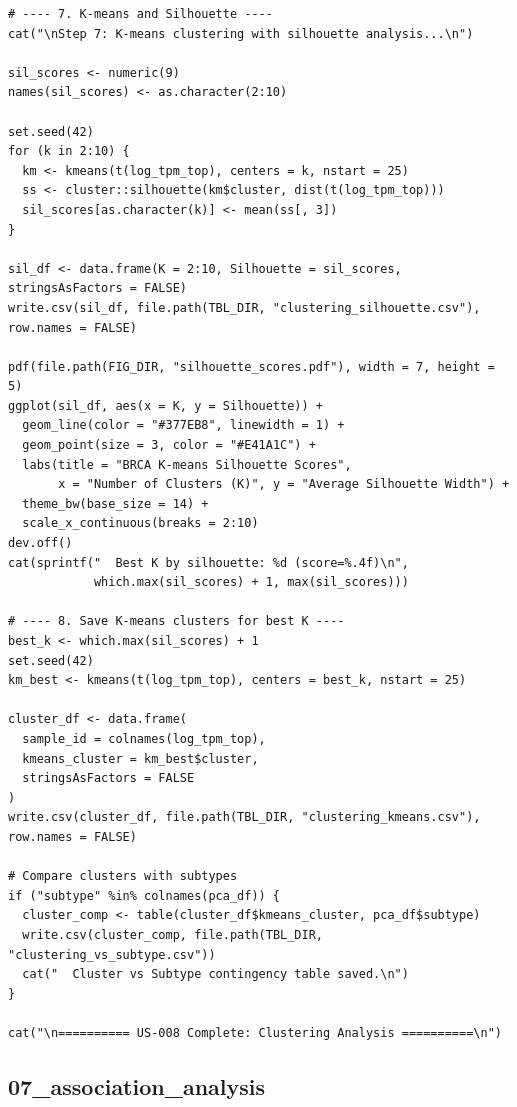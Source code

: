\documentclass[12pt,a4paper]{ctexart}
\begin{document}
\begin{lstlisting}[caption={06_clustering}, basicstyle=\ttfamily\scriptsize]
# ---- 7. K-means and Silhouette ----
cat("\nStep 7: K-means clustering with silhouette analysis...\n")

sil_scores <- numeric(9)
names(sil_scores) <- as.character(2:10)

set.seed(42)
for (k in 2:10) {
  km <- kmeans(t(log_tpm_top), centers = k, nstart = 25)
  ss <- cluster::silhouette(km$cluster, dist(t(log_tpm_top)))
  sil_scores[as.character(k)] <- mean(ss[, 3])
}

sil_df <- data.frame(K = 2:10, Silhouette = sil_scores, stringsAsFactors = FALSE)
write.csv(sil_df, file.path(TBL_DIR, "clustering_silhouette.csv"), row.names = FALSE)

pdf(file.path(FIG_DIR, "silhouette_scores.pdf"), width = 7, height = 5)
ggplot(sil_df, aes(x = K, y = Silhouette)) +
  geom_line(color = "#377EB8", linewidth = 1) +
  geom_point(size = 3, color = "#E41A1C") +
  labs(title = "BRCA K-means Silhouette Scores",
       x = "Number of Clusters (K)", y = "Average Silhouette Width") +
  theme_bw(base_size = 14) +
  scale_x_continuous(breaks = 2:10)
dev.off()
cat(sprintf("  Best K by silhouette: %d (score=%.4f)\n",
            which.max(sil_scores) + 1, max(sil_scores)))

# ---- 8. Save K-means clusters for best K ----
best_k <- which.max(sil_scores) + 1
set.seed(42)
km_best <- kmeans(t(log_tpm_top), centers = best_k, nstart = 25)

cluster_df <- data.frame(
  sample_id = colnames(log_tpm_top),
  kmeans_cluster = km_best$cluster,
  stringsAsFactors = FALSE
)
write.csv(cluster_df, file.path(TBL_DIR, "clustering_kmeans.csv"), row.names = FALSE)

# Compare clusters with subtypes
if ("subtype" %in% colnames(pca_df)) {
  cluster_comp <- table(cluster_df$kmeans_cluster, pca_df$subtype)
  write.csv(cluster_comp, file.path(TBL_DIR, "clustering_vs_subtype.csv"))
  cat("  Cluster vs Subtype contingency table saved.\n")
}

cat("\n========== US-008 Complete: Clustering Analysis ==========\n")
\end{lstlisting}

\subsection{07_association_analysis}
\end{document}
